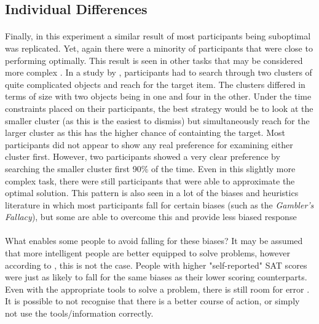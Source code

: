 \documentclass[12pt]{article}
\begin{document}
\subsection*{Individual Differences}
\paragraph{} Finally, in this experiment a similar result of most participants being suboptimal was replicated. Yet, again there were a minority of participants that were close to performing optimally. This result is seen in other tasks that may be considered more complex \citep{Zhang2012handeye}. In a study by \cite{Zhang2012handeye}, participants had to search through two clusters of quite complicated objects and reach for the target item. The clusters differed in terms of size with two objects being in one and four in the other. Under the time constraints placed on their participants, the best strategy would be to look at the smaller cluster (as this is the easiest to dismiss) but simultaneously reach for the larger cluster as this has the higher chance of containting the target. Most participants did not appear to show any real preference for examining either cluster first. However, two participants showed a very clear preference by searching the smaller cluster first 90\% of the time. Even in this slightly more complex task, there were still participants that were able to approximate the optimal solution. This pattern is also seen in a lot of the biases and heuristics literature in which most participants fall for certain biases (such as the \textit{Gambler's Fallacy}), but some are able to overcome this and provide less biased response \cite{stanovich2008relative}

\paragraph{} What enables some people to avoid falling for these biases? It may be assumed that more intelligent people are better equipped to solve problems, however according to \cite{stanovich2008relative}, this is not the case. People with higher "self-reported" SAT scores were just as likely to fall for the same biases as their lower scoring counterparts. Even with the appropriate tools to solve a problem, there is still room for error \citep{KAHNEMAN1982}. It is possible to not recognise that there is a better course of action, or simply not use the tools/information correctly.  
\end{document}
